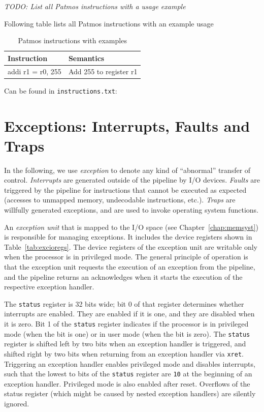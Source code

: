 \documentclass[a4paper,fontsize=10pt,twoside,DIV15,BCOR12mm,headinclude=true,footinclude=false,pagesize,bibtotoc]{scrbook}
\newcommand{\code}[1]{{\texttt{#1}}}
\newcommand{\todo}[1]{{\emph{TODO: #1}}}
\begin{document}
\todo{List all Patmos instructions with a usage example}

Following table lists all Patmos instructions with an example usage
\begin{table}[hb]
  \begin{tabular}{ll}
    \toprule
    Instruction & Semantics \\
    \midrule
    addi r1 = r0, 255 & Add 255 to register r1\\
    \bottomrule
  \end{tabular}
  \caption{Patmos instructions with examples}
  \label{tab:instructions}
\end{table}

Can be found in \code{instructions.txt}:






\clearpage
\section{Exceptions: Interrupts, Faults and Traps}
\label{sec:exc}

In the following, we use \emph{exception} to denote any kind of
``abnormal'' transfer of control. \emph{Interrupts} are generated
outside of the pipeline by I/O devices. \emph{Faults} are triggered by
the pipeline for instructions that cannot be executed as expected
(accesses to unmapped memory, undecodable instructions,
etc.). \emph{Traps} are willfully generated exceptions, and are used
to invoke operating system functions.

An \emph{exception unit} that is mapped to the I/O space (see
Chapter~\ref{chap:memsyst}) is responsible for managing exceptions. It
includes the device registers shown in Table~\ref{tab:excioregs}. The
device registers of the exception unit are writable only when the
processor is in privileged mode. The general principle of operation is
that the exception unit requests the execution of an exception from
the pipeline, and the pipeline returns an acknowledges when it starts
the execution of the respective exception handler.

The \texttt{status} register is 32 bits wide; bit 0 of that register
determines whether interrupts are enabled. They are enabled if it is
one, and they are disabled when it is zero. Bit 1 of the
\texttt{status} register indicates if the processor is in privileged
mode (when the bit is one) or in user mode (when the bit is zero). The
\texttt{status} register is shifted left by two bits when an exception
handler is triggered, and shifted right by two bits when returning
from an exception handler via \texttt{xret}. Triggering an exception
handler enables privileged mode and disables interrupts, such that the
lowest to bits of the \texttt{status} register are \texttt{10} at the
beginning of an exception handler. Privileged mode is also enabled
after reset. Overflows of the status register (which might be caused
by nested exception handlers) are silently ignored.
\end{document}
